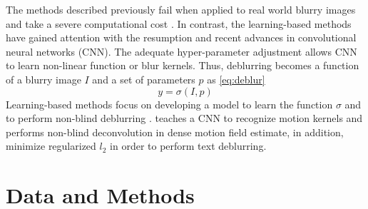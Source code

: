 \documentclass[journal]{IEEEtran}
\begin{document}
The methods described previously fail when applied to real world
blurry images \cite{Lai2016} and take a severe computational cost
\cite{Chakrabarti2016}. In contrast, the learning-based methods
have gained attention with the resumption and recent advances in
convolutional neural networks (CNN). The adequate hyper-parameter
adjustment allows CNN to learn non-linear function or blur kernels.
Thus, deblurring becomes a function of a blurry image $I$ and a set
of parameters $p$ as \ref{eq:deblur}
\begin{equation}
 y = \sigma(I,p)
 \label{eq:deblur}
\end{equation}
Learning-based methods focus on developing a model to learn the function
$\sigma$ and to perform non-blind deblurring \cite{Chakrabarti2016}.
\cite{Sun2015} teaches a CNN to recognize motion kernels and performs non-blind
deconvolution in dense motion field estimate, in addition, \cite{Hradis2015}
minimize regularized $l_2$ in order to perform text deblurring.

\section{Data and Methods}\label{Method}
\end{document}
